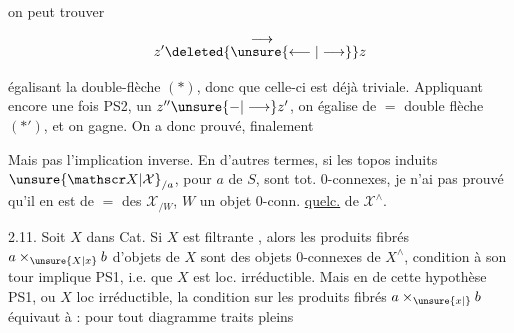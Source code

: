 
on peut trouver

\[
z'\overset{\displaystyle\longrightarrow}{\deleted{\unsure{\longleftarrow|\longrightarrow}}}z
\]

égalisant la double-flèche $(*)$, donc  que celle-ci est déjà triviale. Appliquant encore une fois PS2,   un $z''\unsure{\mathbin{-}|\longrightarrow}z'$, on égalise de $=$  double flèche $(*')$, et on gagne. On a donc prouvé, finalement


Mais pas l'implication inverse. En d'autres termes, si les topos induits $\unsure{\mathscr X|\mathcal X}_{/a}$, pour $a$ de $S$, sont  tot. $0$-connexes, je  n'ai pas prouvé qu'il en est de $=$ des $\mathscr X_{/W}$, $W$ un objet $0$-conn. \uline{quelc.} de $\mathscr X^\wedge$.  

\uline{} 2.11. Soit $X$ dans Cat.  Si $X$ est  filtrante , alors  les produits fibrés $a\times_{\unsure{X|x}}b$ d'objets de $X$ sont des objets $0$-connexes de $X^\wedge$,   condition à son tour implique PS1, i.e. que $X$ est loc. irréductible. Mais en  de cette hypothèse PS1, ou $X$ loc irréductible, la condition sur les produits fibrés $a\times_{\unsure{x|\vphantom{x}}}b$ équivaut à   :  pour tout diagramme traits pleins

